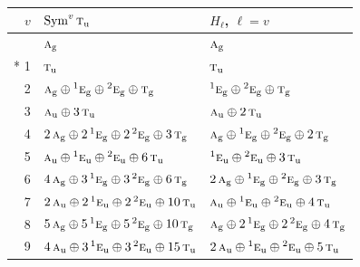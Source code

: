 \documentclass[10pt,a4paper]{article}
\numberwithin{equation}{section}
\newcommand{\irr}[1]{\text{\normalfont\scshape #1}}
\newcommand{\conjpair}[1]{{}^{#1}}
\newcommand{\ptag}[1]{\mathrm{#1}}
\begin{document}
{\small\begin{longtable}{@{}rll@{}}\toprule
$v$ & $\operatorname{Sym}^{v}\irr{t}_{\ptag{u}}$ & $H_\ell$, $\ell = v$\\\midrule\endhead
\bottomrule\endfoot\endlastfoot
0 & $\irr{a}_{\ptag{g}}$ & $\irr{a}_{\ptag{g}}$\\*
1 & $\irr{t}_{\ptag{u}}$ & $\irr{t}_{\ptag{u}}$\\
2 & $\irr{a}_{\ptag{g}} \oplus \conjpair{1}\irr{e}_{\ptag{g}} \oplus \conjpair{2}\irr{e}_{\ptag{g}} \oplus \irr{t}_{\ptag{g}}$ & $\conjpair{1}\irr{e}_{\ptag{g}} \oplus \conjpair{2}\irr{e}_{\ptag{g}} \oplus \irr{t}_{\ptag{g}}$\\
3 & $\irr{a}_{\ptag{u}} \oplus 3\,\irr{t}_{\ptag{u}}$ & $\irr{a}_{\ptag{u}} \oplus 2\,\irr{t}_{\ptag{u}}$\\
4 & $2\,\irr{a}_{\ptag{g}} \oplus 2\,\conjpair{1}\irr{e}_{\ptag{g}} \oplus 2\,\conjpair{2}\irr{e}_{\ptag{g}} \oplus 3\,\irr{t}_{\ptag{g}}$ & $\irr{a}_{\ptag{g}} \oplus \conjpair{1}\irr{e}_{\ptag{g}} \oplus \conjpair{2}\irr{e}_{\ptag{g}} \oplus 2\,\irr{t}_{\ptag{g}}$\\
5 & $\irr{a}_{\ptag{u}} \oplus \conjpair{1}\irr{e}_{\ptag{u}} \oplus \conjpair{2}\irr{e}_{\ptag{u}} \oplus 6\,\irr{t}_{\ptag{u}}$ & $\conjpair{1}\irr{e}_{\ptag{u}} \oplus \conjpair{2}\irr{e}_{\ptag{u}} \oplus 3\,\irr{t}_{\ptag{u}}$\\
6 & $4\,\irr{a}_{\ptag{g}} \oplus 3\,\conjpair{1}\irr{e}_{\ptag{g}} \oplus 3\,\conjpair{2}\irr{e}_{\ptag{g}} \oplus 6\,\irr{t}_{\ptag{g}}$ & $2\,\irr{a}_{\ptag{g}} \oplus \conjpair{1}\irr{e}_{\ptag{g}} \oplus \conjpair{2}\irr{e}_{\ptag{g}} \oplus 3\,\irr{t}_{\ptag{g}}$\\
7 & $2\,\irr{a}_{\ptag{u}} \oplus 2\,\conjpair{1}\irr{e}_{\ptag{u}} \oplus 2\,\conjpair{2}\irr{e}_{\ptag{u}} \oplus 10\,\irr{t}_{\ptag{u}}$ & $\irr{a}_{\ptag{u}} \oplus \conjpair{1}\irr{e}_{\ptag{u}} \oplus \conjpair{2}\irr{e}_{\ptag{u}} \oplus 4\,\irr{t}_{\ptag{u}}$\\
8 & $5\,\irr{a}_{\ptag{g}} \oplus 5\,\conjpair{1}\irr{e}_{\ptag{g}} \oplus 5\,\conjpair{2}\irr{e}_{\ptag{g}} \oplus 10\,\irr{t}_{\ptag{g}}$ & $\irr{a}_{\ptag{g}} \oplus 2\,\conjpair{1}\irr{e}_{\ptag{g}} \oplus 2\,\conjpair{2}\irr{e}_{\ptag{g}} \oplus 4\,\irr{t}_{\ptag{g}}$\\
9 & $4\,\irr{a}_{\ptag{u}} \oplus 3\,\conjpair{1}\irr{e}_{\ptag{u}} \oplus 3\,\conjpair{2}\irr{e}_{\ptag{u}} \oplus 15\,\irr{t}_{\ptag{u}}$ & $2\,\irr{a}_{\ptag{u}} \oplus \conjpair{1}\irr{e}_{\ptag{u}} \oplus \conjpair{2}\irr{e}_{\ptag{u}} \oplus 5\,\irr{t}_{\ptag{u}}$\\

\end{longtable}}
\end{document}
